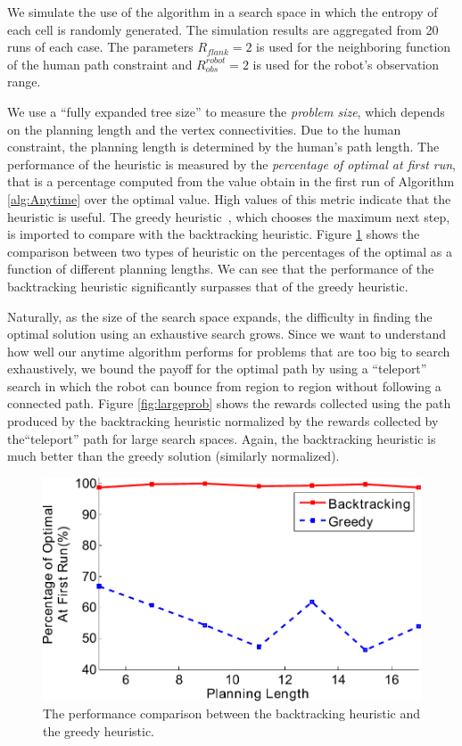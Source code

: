 We simulate the use of the algorithm in a search space in which the entropy of each cell is randomly generated.
The simulation results are aggregated from 20 runs of each case.
The parameters $ R_{flank} = 2 $ is used for the neighboring function of the human path constraint and $ R^{robot}_{obs} = 2 $ is used for the robot's observation range.

We use a ``fully expanded tree size'' to measure the \emph{problem size}, which depends on the planning length and the vertex connectivities.
Due to the human constraint, the planning length is determined by the human's path length.
The performance of the heuristic is measured by the \emph{percentage of optimal at first run}, that is a percentage computed from the value obtain in the first run of Algorithm \ref{alg:Anytime} over the optimal value.
High values of this metric indicate that the heuristic is useful.
The greedy heuristic~\cite{singh2009efficient}, which chooses the maximum next step, is imported to compare with the backtracking heuristic.
Figure \ref{fig:compareGreedy} shows the comparison between two types of heuristic on the percentages of the optimal as a function of different planning lengths.
We can see that the performance of the backtracking heuristic significantly surpasses that of the greedy heuristic.

Naturally, as the size of the search space expands, the difficulty in finding the optimal solution using an exhaustive search grows.  Since we want to understand how well our anytime algorithm performs for problems that are too big to search exhaustively, we bound the payoff for the optimal path by using a ``teleport'' search in which the robot can bounce from region to region without following a connected path.
Figure \ref{fig:largeprob} shows the rewards collected using the path produced by the backtracking heuristic normalized by the rewards collected by the``teleport'' path for large search spaces. Again, the backtracking heuristic is  much better than the greedy solution (similarly normalized).

\begin{figure}
\centering
\includegraphics[width=0.7\linewidth]{./images/compareGreedy}
\caption{The performance comparison between the backtracking heuristic and the greedy heuristic.}
\label{fig:compareGreedy}
\end{figure}

